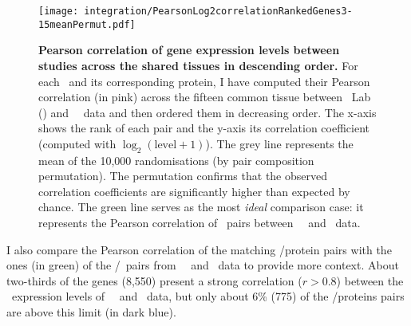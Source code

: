 \begin{figure}[!htb]
    \texttt{[image: integration/PearsonLog2correlationRankedGenes3-15meanPermut.pdf]}\centering
    \vspace{-3mm}
    \caption[Pearson correlation coefficients of gene expression levels
    between studies in descending order]%
    {\label{fig:GeneProtCor}\textbf{Pearson correlation of gene expression levels
    between studies across the shared tissues in descending order.}
    For each \mRNA\ and its corresponding protein,
    I have computed their Pearson correlation (in pink)
    across the fifteen common tissue
    between \pandey\ Lab (\PPKM) and \uhlen\ \etal\ data
    and then ordered them in decreasing order.
    The x-axis shows the rank of each pair
    and the y-axis its correlation coefficient
    (computed with $\log_2(\text{level}+1)$).
    The grey line represents the mean of the 10,000 randomisations
    (by pair composition permutation).
    The permutation confirms that the observed correlation coefficients are
    significantly higher than expected by chance.
    The green line serves as the most \emph{ideal} comparison case:
    it represents the Pearson correlation of \mRNAs\ pairs
    between \uhlen\ \etal\ and \gtex\ data.
    }
    \vspace{-1em}
\end{figure}

I also compare the Pearson correlation of the matching \mRNAs/protein pairs
with the ones (in green) of the \mRNAs{}/\mRNAs\ pairs
from \uhlen\ \etal\ and \gtex\ data
to provide more context.
About two-thirds of the genes (8,550) present a strong correlation
($r>0.8$)
between the \mRNA\ expression levels of \uhlen\ \etal\ and \gtex\ data,
but only about 6\% (775) of the \mRNA/proteins pairs are above this limit
(in dark blue).\mybr\

